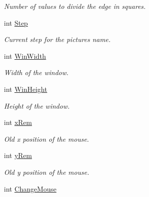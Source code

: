 \begin{DoxyCompactItemize}
\begin{DoxyCompactList}\small\item\em Number of values to divide the edge in squares. \end{DoxyCompactList}\item 
int \hyperlink{classDraw_a20146731f2945f9b0c25d61e11bb0217}{Step}\hypertarget{classDraw_a20146731f2945f9b0c25d61e11bb0217}{}\label{classDraw_a20146731f2945f9b0c25d61e11bb0217}

\begin{DoxyCompactList}\small\item\em Current step for the picture\textquotesingle{}s name. \end{DoxyCompactList}\item 
int \hyperlink{classDraw_a7bc33449edbe70d0faa8d9b08ac317e7}{Win\+Width}\hypertarget{classDraw_a7bc33449edbe70d0faa8d9b08ac317e7}{}\label{classDraw_a7bc33449edbe70d0faa8d9b08ac317e7}

\begin{DoxyCompactList}\small\item\em Width of the window. \end{DoxyCompactList}\item 
int \hyperlink{classDraw_a14d631ded45fe3c6396d41f0b31a8aba}{Win\+Height}\hypertarget{classDraw_a14d631ded45fe3c6396d41f0b31a8aba}{}\label{classDraw_a14d631ded45fe3c6396d41f0b31a8aba}

\begin{DoxyCompactList}\small\item\em Height of the window. \end{DoxyCompactList}\item 
int \hyperlink{classDraw_a4986cb639db34359529f5bdb3766509e}{x\+Rem}\hypertarget{classDraw_a4986cb639db34359529f5bdb3766509e}{}\label{classDraw_a4986cb639db34359529f5bdb3766509e}

\begin{DoxyCompactList}\small\item\em Old x position of the mouse. \end{DoxyCompactList}\item 
int \hyperlink{classDraw_a818fd7b65f3a0d9f59ce4551b9d408bc}{y\+Rem}\hypertarget{classDraw_a818fd7b65f3a0d9f59ce4551b9d408bc}{}\label{classDraw_a818fd7b65f3a0d9f59ce4551b9d408bc}

\begin{DoxyCompactList}\small\item\em Old y position of the mouse. \end{DoxyCompactList}\item 
int \hyperlink{classDraw_aa43ab0002e5c0ec8f09f3cdef0f527af}{Change\+Mouse}\hypertarget{classDraw_aa43ab0002e5c0ec8f09f3cdef0f527af}{}\label{classDraw_aa43ab0002e5c0ec8f09f3cdef0f527af}


\end{DoxyCompactItemize}
